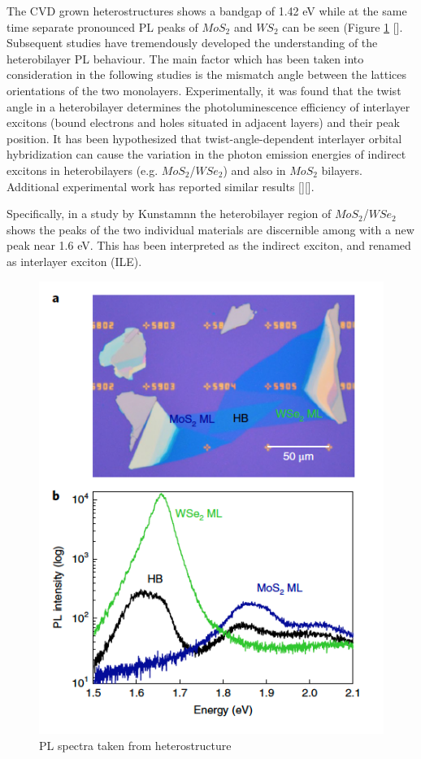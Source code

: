 The CVD grown heterostructures shows a bandgap of 1.42 eV while at the same time separate pronounced PL peaks of $MoS_2$ and $WS_2$ can be seen (Figure \ref{fig:HeterostructurePLSpectrumInterlayerIntro} [].  
Subsequent studies have tremendously developed the understanding of the heterobilayer PL behaviour. The main factor which has been taken into consideration in the following studies is the mismatch angle between the lattices orientations of the two monolayers.
Experimentally, it was found that the twist angle in a heterobilayer determines the photoluminescence efficiency of interlayer excitons (bound  electrons and holes situated in adjacent layers) and their peak position.
It has been hypothesized that twist-angle-dependent interlayer orbital hybridization can cause the variation in the photon emission energies of indirect excitons in heterobilayers (e.g. $MoS_2$/$WSe_2$) and also in $MoS_2$ bilayers. Additional experimental work has reported similar results [][]. 

Specifically, in a study by Kunstamnn \cite{Kunstmann2018} the heterobilayer region of $MoS_2$/$WSe_2$ shows the peaks of the two individual materials are discernible among with a new peak near 1.6 eV. This has been interpreted as the indirect exciton, and renamed as interlayer exciton (ILE).

\begin{figure}[h]
	\begin{center}
		\includegraphics[scale=1]{Heterostructures/HeterostructurePLSpectrumInterlayerIntro.png}
		\caption{PL spectra taken from heterostructure \cite{Kunstmann2018}}
		\label{fig:HeterostructurePLSpectrumInterlayerIntro}
	\end{center}
\end{figure}

